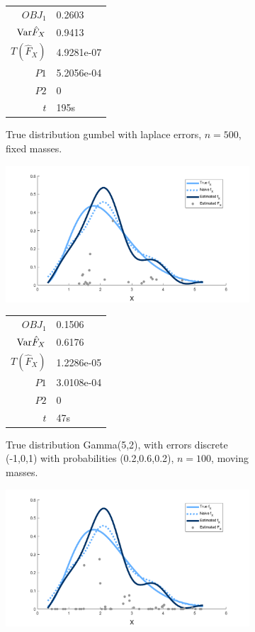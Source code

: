 \begin{figure}
\begin{subfigure}[b]{0.38\textwidth}
		\begin{tabular}{r l}
			$OBJ_1$ & 0.2603\\
			$\mathrm{Var} \hat{F}_X$ & 0.9413\\
			$T(\hat{F}_X)$ & 4.9281e-07\\
			$P1$ & 5.2056e-04\\
			$P2$ & 0\\
			$t$ & 195s
		\end{tabular}
		\caption{True distribution gumbel with laplace errors, $n = 500$, fixed masses.}
		\label{fig:fixed masses gumbel lap}
	\end{subfigure}
	\begin{subfigure}[b]{0.38\textwidth}
		\centering
		\includegraphics[width = \textwidth]{Figures/Deconvolution/moving_masses_gamma_discrete_n100_example.png}
		\begin{tabular}{r l}
			$OBJ_1$ & 0.1506\\
			$\mathrm{Var} \hat{F}_X$ & 0.6176\\
			$T(\hat{F}_X)$ & 1.2286e-05\\
			$P1$ & 3.0108e-04\\
			$P2$ & 0\\
			$t$ & 47s
		\end{tabular}
		\caption{True distribution Gamma(5,2), with errors discrete (-1,0,1) with probabilities (0.2,0.6,0.2), $n = 100$, moving masses.}
		\label{fig:moving masses gamma discrete}
	\end{subfigure}
	\hfill
	\begin{subfigure}[b]{0.38\textwidth}
		\centering
		\includegraphics[width = \textwidth]{Figures/Deconvolution/fixed_masses_gamma_discrete_n100_example.png}

\end{subfigure}
\end{figure}

